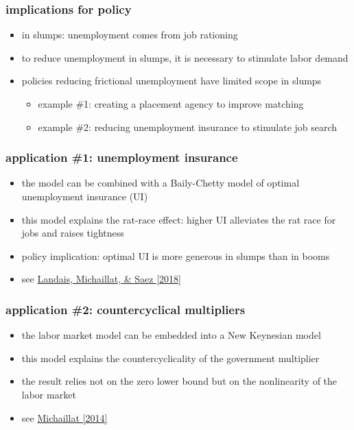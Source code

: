 \documentclass[12pt,xcolor={dvipsnames},hyperref={pdftex,pdfpagemode=UseNone,hidelinks,pdfdisplaydoctitle=true},usepdftitle=false]{beamer}
\begin{document}
\begin{frame}
\frametitle{implications for policy}
\begin{itemize}
\item in slumps: unemployment comes from job rationing 
\item[\then] to reduce unemployment in slumps, it is necessary to stimulate labor demand
\item[\then] policies reducing frictional unemployment have limited scope in slumps
\begin{itemize}
\item example \#1: creating a placement agency to improve matching
\item example \#2: reducing unemployment insurance to stimulate job search
\end{itemize}
\end{itemize}
\end{frame}


\begin{frame}
\frametitle{application \#1: unemployment insurance}
\begin{itemize}
\item the model can be combined with a Baily-Chetty model of optimal unemployment insurance (UI)
\item this model explains the rat-race effect: higher UI alleviates the rat race for jobs and raises tightness
\item policy implication: optimal UI is more generous in slumps than in booms
\item see \href{https://www.pascalmichaillat.org/4.html}{Landais, Michaillat, \& Saez [2018]}
\end{itemize}
\end{frame}


\begin{frame}
\frametitle{application \#2: countercyclical multipliers}
\begin{itemize}
\item the labor market model can be embedded into a New Keynesian model
\item this model explains the countercyclicality of the government multiplier
\item the result relies not on the zero lower bound but on the nonlinearity of the labor market
\item see \href{https://www.pascalmichaillat.org/2.html}{Michaillat [2014]}
\end{itemize}
\end{frame}
\end{document}
